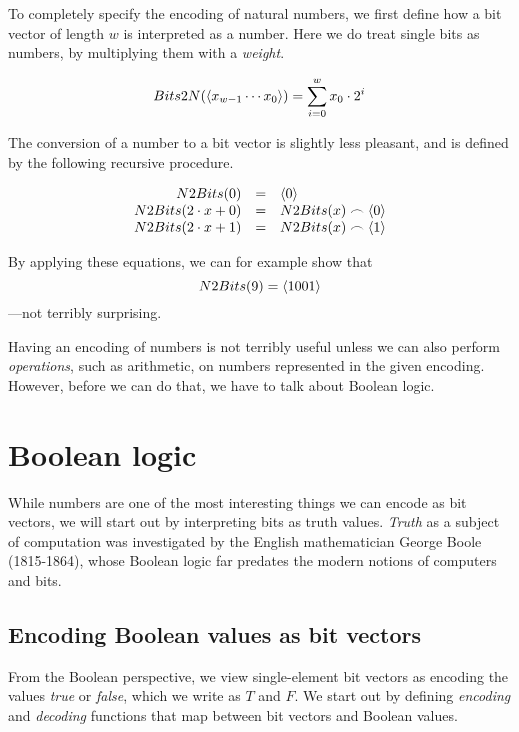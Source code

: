 To completely specify the encoding of natural numbers, we first define
how a bit vector of length $w$ is interpreted as a number.  Here we do
treat single bits as numbers, by multiplying them with a
\emph{weight}.

\[
    Bits2N(\langle x_{w-1}\cdots x_{0} \rangle)  = \sum_{i=0}^{w} x_{0} \cdot{} 2^{i}
\]

The conversion of a number to a bit vector is slightly less pleasant,
and is defined by the following recursive procedure.

\[
  \begin{array}{rcl}
    N2Bits(0)  &=& \langle 0 \rangle \\
    N2Bits(2\cdot{}x + 0) &=& N2Bits(x)\frown\langle 0 \rangle \\
    N2Bits(2\cdot{}x + 1) &=& N2Bits(x)\frown\langle 1 \rangle \\
  \end{array}
\]

By applying these equations, we can for example show that
\[
  N2Bits(9)=\langle 1001 \rangle
\]
---not terribly surprising.

Having an encoding of numbers is not terribly useful unless we can
also perform \emph{operations}, such as arithmetic, on numbers
represented in the given encoding.  However, before we can do that, we
have to talk about Boolean logic.

\section{Boolean logic}
\label{sec:boolean-logic}

While numbers are one of the most interesting things we can encode as
bit vectors, we will start out by interpreting bits as truth values.
\emph{Truth} as a subject of computation was investigated by the
English mathematician George Boole (1815-1864), whose Boolean logic
far predates the modern notions of computers and bits.

\subsection{Encoding Boolean values as bit vectors}

From the Boolean perspective, we view single-element bit vectors as
encoding the values \emph{true} or \emph{false}, which we write as $T$
and $F$.  We start out by defining \emph{encoding} and \emph{decoding}
functions that map between bit vectors and Boolean values.

